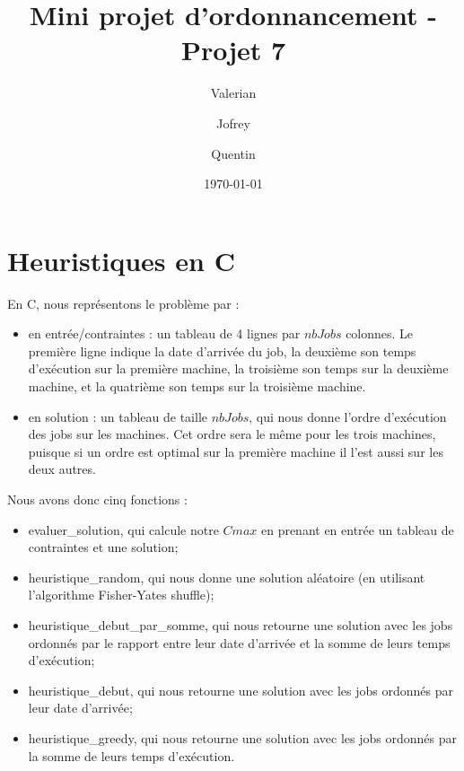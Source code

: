 \documentclass[11pt]{article} %
\title{Mini projet d'ordonnancement - Projet 7}
\author{Valerian \bsc{Damm} \and Jofrey \bsc{Luc} \and Quentin \bsc{Sonrel}}
\date\today
\let\stdtoc\tableofcontents
\renewcommand\tableofcontents{\thispagestyle{empty}\setcounter{page}{0}\stdtoc}
\begin{document}

\maketitle
%





\section{Heuristiques en C}

En C, nous représentons le problème par :

\begin{itemize}
	\item en entrée/contraintes : un tableau de 4 lignes par $nbJobs$ colonnes. Le première ligne indique la date d'arrivée du job, la deuxième son temps d'exécution sur la première machine, la troisième son temps sur la deuxième machine, et la quatrième son temps sur la troisième machine.
	\item en solution : un tableau de taille $nbJobs$, qui nous donne l'ordre d'exécution des jobs sur les machines. Cet ordre sera le même pour les trois machines, puisque si un ordre est optimal sur la première machine il l'est aussi sur les deux autres.\\
\end{itemize}

Nous avons donc cinq fonctions :

\begin{itemize}
	\item evaluer\_solution, qui calcule notre $Cmax$ en prenant en entrée un tableau de contraintes et une solution;
	\item heuristique\_random, qui nous donne une solution aléatoire (en utilisant l'algorithme Fisher-Yates shuffle);
	\item heuristique\_debut\_par\_somme, qui nous retourne une solution avec les jobs ordonnés par le rapport entre leur date d'arrivée et la somme de leurs temps d'exécution;
	\item heuristique\_debut, qui nous retourne une solution avec les jobs ordonnés par leur date d'arrivée;
	\item heuristique\_greedy, qui nous retourne une solution avec les jobs ordonnés par la somme de leurs temps d'exécution.
\end{itemize}
\end{document}
